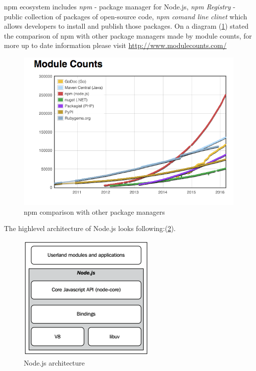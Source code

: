 npm ecosystem includes \textit{npm} - package manager for Node.js, \textit{npm Registry} - public collection of packages of open-source code, \textit{npm comand line clinet} which allows developers to install and publish those packages. On a diagram (\ref{fig:npmStat}) stated the comparison of npm with other package managers made by module counts, for more up to date information please visit \url{http://www.modulecounts.com/}
\begin{figure}[ht]
  	\label{fig:npmStat}
    \centering
    \includegraphics[width=\textwidth]{grafiken/modulecounts.png}
     \caption{npm comparison with other package managers\cite{moduleCounts}}
  \end{figure}

The highlevel architecture of Node.js looks following:(\ref{fig:nodeArch}). 
\begin{figure}[ht]
  	\label{fig:nodeArch}
    \centering
    \includegraphics[scale=1.0]{grafiken/nodeArchitecture.png}
     \caption{Node.js architecture \cite{nodejsbook}}
  \end{figure}

